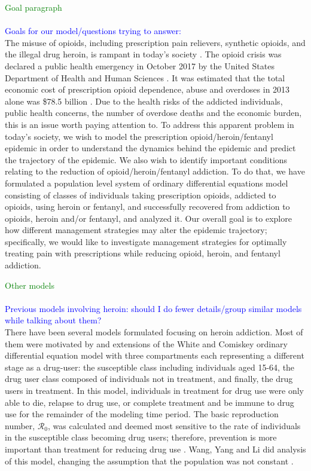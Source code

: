 \documentclass[12pt]{article}
\begin{document}
\textcolor{green}{Goal paragraph} \\ \\
\textcolor{blue}{Goals for our model/questions trying to answer:} \\
The misuse of opioids, including prescription pain relievers, synthetic opioids, and the illegal drug heroin, is rampant in today's society \cite{NIH2}. The opioid crisis was declared a public health emergency in October 2017 by the United States Department of Health and Human Sciences \cite{HHS1}. It was estimated that the total economic cost of prescription opioid dependence, abuse and overdoses in 2013 alone was \$78.5 billion \cite{Florence}. Due to the health risks of the addicted individuals, public health concerns, the number of overdose deaths and the economic burden, this is an issue worth paying attention to.
To address this apparent problem in today's society, we wish to model the prescription opioid/heroin/fentanyl epidemic in order to understand the dynamics behind the epidemic and predict the trajectory of the epidemic. We also wish to identify important conditions relating to the reduction of opioid/heroin/fentanyl addiction. To do that, we have formulated a population level system of ordinary differential equations model consisting of classes of individuals taking prescription opioids, addicted to opioids, using heroin or fentanyl, and successfully recovered from addiction to opioids, heroin and/or fentanyl, and analyzed it. Our overall goal is to explore how different management strategies may alter the epidemic trajectory; specifically, we would like to investigate management strategies for optimally treating pain with prescriptions while reducing opioid, heroin, and fentanyl addiction.

\textcolor{green}{Other models} \\ \\
\textcolor{blue}{Previous models involving heroin: should I do fewer details/group similar models while talking about them?} \\
There have been several models formulated focusing on heroin addiction. Most of them were motivated by and extensions of the White and Comiskey ordinary differential equation model with three compartments each representing a different stage as a drug-user: the susceptible class including individuals aged 15-64, the drug user class composed of individuals not in treatment, and finally, the drug users in treatment. In this model, individuals in treatment for drug use were only able to die, relapse to drug use, or complete treatment and be immune to drug use for the remainder of the modeling time period. The basic reproduction number, $\mathscr{R}_0$, was calculated and deemed most sensitive to the rate of individuals in the susceptible class becoming drug users; therefore, prevention is more important than treatment for reducing drug use \cite{White}. Wang, Yang and Li did analysis of this model, changing the assumption that the population was not constant \cite{Wang}. 
\end{document}
